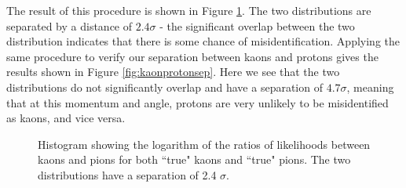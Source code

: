 The result of this procedure is shown in Figure \ref{fig:kaonpionsep}. The two distributions are separated by a distance of $2.4 \sigma$ - the significant overlap between the two distribution indicates that there is some chance of misidentification. Applying the same procedure to verify our separation between kaons and protons gives the results shown in Figure \ref{fig:kaonprotonsep}. Here we see that the two distributions do not significantly overlap and have a separation of $4.7 \sigma$, meaning that at this momentum and angle, protons are very unlikely to be misidentified as kaons, and vice versa.
\begin{figure}[]
\centering
{}
\caption[Particle identification separation for 7 GeV pions and kaons]{Histogram showing the logarithm of the ratios of likelihoods between kaons and pions for both ``true" kaons and ``true" pions. The two distributions have a separation of 2.4 $\sigma$.}
\label{fig:kaonpionsep} 
\end{figure}


